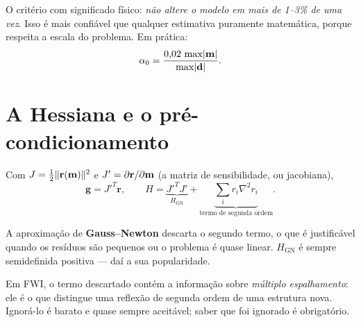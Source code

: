 \documentclass[11pt,a4paper,oneside]{report}
\begin{document}
\begin{atencao}
O crit\'erio com significado f\'isico: \emph{n\~ao altere o modelo em mais de
1--3\% de uma vez}. Isso \'e mais confi\'avel que qualquer estimativa
puramente matem\'atica, porque respeita a escala do problema. Em pr\'atica:
\[
\alpha_0 = \frac{0{,}02\,\max\lvert \mathbf{m} \rvert}{\max\lvert \mathbf{d} \rvert} .
\]
\end{atencao}

\section{A Hessiana e o pr\'e-condicionamento}

\begin{derivacao}
Com $J = \tfrac12\lVert \mathbf{r}(\mathbf{m}) \rVert^{2}$ e $J' = \partial\mathbf{r}/
\partial\mathbf{m}$ (a matriz de sensibilidade, ou jacobiana),
\begin{equation}
\mathbf{g} = J'^{T}\mathbf{r},
\qquad
H = \underbrace{J'^{T}J'}_{H_{\text{GN}}}
  + \underbrace{\sum_i r_i \nabla^{2} r_i}_{\text{termo de segunda ordem}} .
\label{eq:hessiana}
\end{equation}

A aproxima\c{c}\~ao de \textbf{Gauss--Newton} descarta o segundo termo, o que
\'e justific\'avel quando os res\'iduos s\~ao pequenos ou o problema \'e
quase linear. $H_{\text{GN}}$ \'e sempre semidefinida positiva --- da\'i a sua
popularidade.

Em FWI, o termo descartado cont\'em a informa\c{c}\~ao sobre \emph{m\'ultiplo
espalhamento}: ele \'e o que distingue uma reflex\~ao de segunda ordem de uma
estrutura nova. Ignor\'a-lo \'e barato e quase sempre aceit\'avel; saber que
foi ignorado \'e obrigat\'orio.
\end{derivacao}
\end{document}

